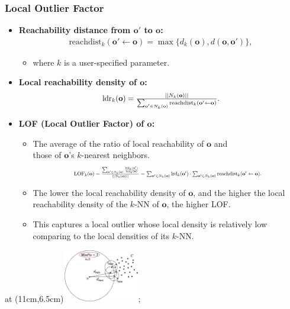 \begin{frame}
  \frametitle{Local Outlier Factor}
  \begin{itemize}
  \item \textbf{\color{airforceblue}Reachability distance from $\mathbf{o'}$ to $\mathbf{o}$:}
    \begin{align*}
      \text{reachdist}_k(\mathbf{o'} \leftarrow \mathbf{o}) = \max \{d_k(\mathbf{o}), d(\mathbf{o},\mathbf{o'})\},
    \end{align*}
    \begin{itemize}
    \item where $k$ is a user-specified parameter.
    \end{itemize}
  \item \textbf{Local reachability density of $\mathbf{o}$:}
    \begin{align*}
      \resizebox{5cm}{!}{%
      $\text{ldr}_k(\mathbf{o}) = \frac{||N_k(\mathbf{o})||}{\sum_{\mathbf{o'} \in N_k(\mathbf{o})} \text{reachdist}_k(\mathbf{o'} \leftarrow \mathbf{o})}.$}
    \end{align*}
  \item \textbf{LOF (Local Outlier Factor) of $\mathbf{o}$:}
    \begin{itemize}
    \item The average of the ratio of local reachability of $\mathbf{o}$ and \\
      those of $\mathbf{o}$'s $k$-nearest neighbors.
      \begin{align*}
        \resizebox{8cm}{!}{%
        $\text{LOF}_k(\mathbf{o}) = \frac{\sum_{\mathbf{o'} \in N_k(\mathbf{o})} \frac{\text{lrd}_k(\mathbf{o'})}{\text{lrd}_k(\mathbf{o})}}{||N_k(\mathbf{o})||} =
        \sum_{\mathbf{o'} \in N_k(\mathbf{o})} \text{lrd}_k(\mathbf{o'}) \cdot \sum_{\mathbf{o'} \in N_k(\mathbf{o})} \text{reachdist}_k(\mathbf{o'} \leftarrow \mathbf{o}).$}
      \end{align*}
    \item The lower the local reachability density of $\mathbf{o}$, and the higher the local reachability density of the $k$-NN of $\mathbf{o}$, the higher LOF.
    \item This captures a local outlier whose local density is relatively low comparing to the local densities of its $k$-NN.
    \end{itemize}
  \end{itemize}
  \tikzoverlay at (11cm,6.5cm){\includegraphics[width=0.25\textwidth]{img/density.png}};
\end{frame}
